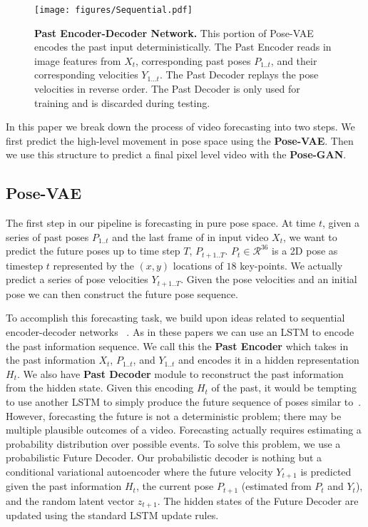 \begin{figure}
\centering
\texttt{[image: figures/Sequential.pdf]} 
\caption{{\bf Past Encoder-Decoder Network.} This portion of Pose-VAE encodes the past input deterministically. The Past Encoder reads in image features from $X_{t}$, corresponding past poses $P_{1..t}$, and their corresponding velocities $Y_{1...t}$. The Past Decoder replays the pose velocities in reverse order. The Past Decoder is only used for training and is discarded during testing. }
\label{fig:SequentialPast}
\end{figure}

In this paper we break down the process of video forecasting into two steps. We first predict the high-level movement in pose space using the \textbf{Pose-VAE}.
Then we use this structure to predict a final pixel level video with the \textbf{Pose-GAN}. 

\subsection{Pose-VAE}
The first step in our pipeline is forecasting in pure pose space. At time $t$, given a series of past poses $P_{1..t}$ and the last frame of in input video $X_{t}$, we want to predict the future poses up to time step $T$, $P_{t+1..T}$. $P_t \in \mathcal{R}^{36}$ is a 2D pose as timestep $t$ represented by the $(x,y)$ locations of $18$ key-points. We actually predict a series of pose velocities $Y_{t+1..T}$.
Given the pose velocities and an initial pose we can then construct the future pose sequence.





To accomplish this forecasting task, we build upon ideas related to sequential encoder-decoder networks ~\cite{Srivastava15, Fragikiadaki15}. As in these papers we can use an LSTM to encode the past information sequence. We call this the \textbf{Past Encoder} which takes in the past information $X_t$, $P_{1..t}$, and $Y_{1..t}$ and encodes it in a hidden representation $H_t$. We also have \textbf{Past Decoder} module to reconstruct the past information from the hidden state. Given this encoding $H_t$ of the past, it would be tempting to use another LSTM to simply produce the future sequence of poses similar to~\cite{Srivastava15}. However, forecasting the future is not a deterministic problem; there may be multiple plausible outcomes of a video. Forecasting actually requires estimating a probability distribution over possible events. To solve this problem, we use a probabilistic Future Decoder. Our probabilistic decoder is nothing but a conditional variational autoencoder where the future velocity $Y_{t+1}$ is predicted given the past information $H_t$, the current pose $P_{t+1}$ (estimated from $P_t$ and $Y_t$), and the random latent vector $z_{t+1}$. The hidden states of the Future Decoder are updated using the standard LSTM update rules.

